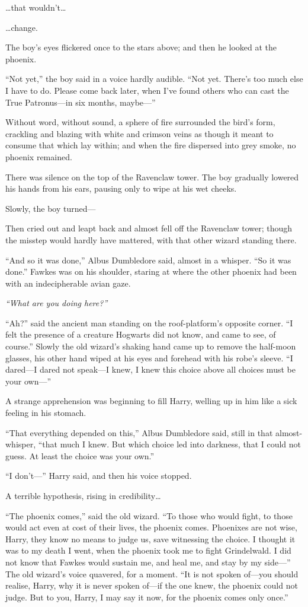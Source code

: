 \ldots{}that wouldn't\ldots{}

\ldots{}change.

The boy's eyes flickered once to the stars above; and then he looked at
the phoenix.

``Not yet,'' the boy said in a voice hardly audible. ``Not yet. There's
too much else I have to do. Please come back later, when I've found
others who can cast the True Patronus---in six months, maybe---''

Without word, without sound, a sphere of fire surrounded the bird's
form, crackling and blazing with white and crimson veins as though it
meant to consume that which lay within; and when the fire dispersed into
grey smoke, no phoenix remained.

There was silence on the top of the Ravenclaw tower. The boy gradually
lowered his hands from his ears, pausing only to wipe at his wet cheeks.

Slowly, the boy turned---

Then cried out and leapt back and almost fell off the Ravenclaw tower;
though the misstep would hardly have mattered, with that other wizard
standing there.

``And so it was done,'' Albus Dumbledore said, almost in a whisper. ``So
it was done.'' Fawkes was on his shoulder, staring at where the other
phoenix had been with an indecipherable avian gaze.

\emph{``What are you doing here?''}

``Ah?'' said the ancient man standing on the roof-platform's opposite
corner. ``I felt the presence of a creature Hogwarts did not know, and
came to see, of course.'' Slowly the old wizard's shaking hand came up
to remove the half-moon glasses, his other hand wiped at his eyes and
forehead with his robe's sleeve. ``I dared---I dared not speak---I knew,
I knew this choice above all choices must be your own---''

A strange apprehension was beginning to fill Harry, welling up in him
like a sick feeling in his stomach.

``That everything depended on this,'' Albus Dumbledore said, still in
that almost-whisper, ``that much I knew. But which choice led into
darkness, that I could not guess. At least the choice was your own.''

``I don't---'' Harry said, and then his voice stopped.

A terrible hypothesis, rising in credibility\ldots{}

``The phoenix comes,'' said the old wizard. ``To those who would fight,
to those would act even at cost of their lives, the phoenix comes.
Phoenixes are not wise, Harry, they know no means to judge us, save
witnessing the choice. I thought it was to my death I went, when the
phoenix took me to fight Grindelwald. I did not know that Fawkes would
sustain me, and heal me, and stay by my side---'' The old wizard's voice
quavered, for a moment. ``It is not spoken of---you should realise,
Harry, why it is never spoken of---if the one knew, the phoenix could
not judge. But to you, Harry, I may say it now, for the phoenix comes
only once.''

